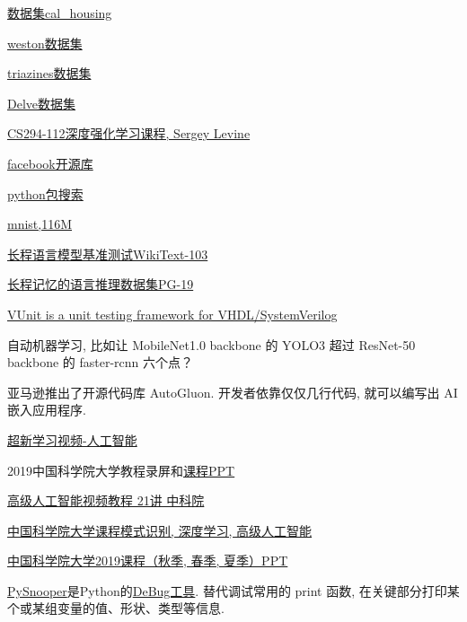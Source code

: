 \href{http://www.dcc.fc.up.pt/ltorgo/Regression/cal_housing.html}{数据集cal\_housing}

\href{http://leon.bottou.org/papers/bordes-ertekin-weston-bottou-2005}{weston数据集}

\href{http://mldata.org/repository/data/viewslug/regression-datasets-triazines/}{triazines数据集}

\href{http://www.cs.toronto.edu/~delve/data/datasets.html}{Delve数据集}

\href{http://rail.eecs.berkeley.edu/deeprlcourse/}{CS294-112深度强化学习课程, Sergey Levine}

\href{https://github.com/facebookresearch}{facebook开源库}

\href{https://github.com/}{python包搜索}

\href{http://yann.lecun.com/exdb/mnist/t10k-images-idx3-ubyte.gz}{mnist,116M}

\href{http://academictorrents.com/details/a4fee5547056c845e31ab952598f43b42333183c}{长程语言模型基准测试WikiText-103}

\href{https://console.cloud.google.com/storage/browser/deepmind-gutenberg}{长程记忆的语言推理数据集PG-19} \cite{raecompressive2019}

\href{http://vunit.github.io/}{VUnit is a unit testing framework for VHDL/SystemVerilog}

自动机器学习, 比如让 MobileNet1.0 backbone 的 YOLO3 超过 ResNet-50 backbone 的 faster-rcnn 六个点？

亚马逊推出了开源代码库 AutoGluon. 开发者依靠仅仅几行代码, 就可以编写出 AI 嵌入应用程序.

\href{https://www.bilibili.com/video/av33395309/}{超新学习视频-人工智能}

2019中国科学院大学教程录屏和\href{https://github.com/HuangCongQing/UCAS_Course_2019}{课程PPT}

\href{https://www.iqiyi.com/v_19rr1o847g.html#curid=1148884000_8c04c5033512842cb378be129ace634e}{高级人工智能视频教程 21讲 中科院}

\href{https://github.com/univeryinli/ucas-ppt}{中国科学院大学课程模式识别, 深度学习, 高级人工智能}

\href{https://github.com/zggl/UCAS_Course_2019}{中国科学院大学2019课程（秋季, 春季, 夏季）PPT}

\href{https://pypi.org/project/PySnooper/}{PySnooper}是Python的\href{https://github.com/cool-RR/PySnooper}{DeBug工具}. 替代调试常用的 print 函数, 在关键部分打印某个或某组变量的值、形状、类型等信息.

